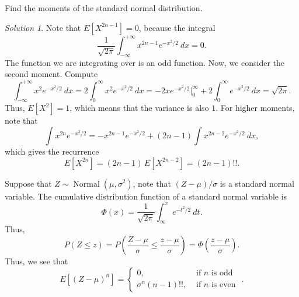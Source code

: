 \documentclass[11pt]{article}
\newcommand\E[1]{E\left[#1\right]}
\theoremstyle{definition}
\theoremstyle{remark}
\newtheorem*{solution}{Solution}
\numberwithin{equation}{module}
\begin{document}
    \begin{exercise}
        Find the moments of the standard normal distribution.
        \begin{solution}
            Note that $\E{X^{2n - 1}} = 0$, because the integral \[
                \frac{1}{\sqrt{2\pi}}\int_{-\infty}^{+\infty} x^{2n - 1}e^{-x^2 /
                2}\:dx = 0.
            \] The function we are integrating over is an odd function. Now, we
            consider the second moment. Compute \[
                \int_{-\infty}^{+\infty} x^2 e^{-x^2 / 2}\:dx = 2 \int_0^\infty x^2
                e^{-x^2 / 2}\:dx = -2xe^{-x^2 / 2}\Big|_0^\infty + 2\int_0^\infty
                e^{-x^2 / 2}\:dx = \sqrt{2\pi}.
            \] Thus, $\E{X^2} = 1$, which means that the variance is also $1$. For
            higher moments, note that \[
                \int x^{2n}e^{-x^2 / 2} = -x^{2n - 1}e^{-x^2 / 2} + (2n - 1)
                \int x^{2n - 2} e^{-x^2 / 2}\:dx,
            \] which gives the recurrence \[
                \E{X^{2n}} = (2n - 1)\, \E{X^{2n - 2}} = (2n - 1)!!.
            \] 
        \end{solution}
    \end{exercise}
    Suppose that $Z \sim \operatorname{Normal}(\mu, \sigma^2)$, note that $(Z - \mu)
    / \sigma$ is a standard normal variable. The cumulative distribution function of
    a standard normal variable is \[
        \Phi(x) = \frac{1}{\sqrt{2\pi}} \int_{\infty}^x e^{-t^2 / 2}\:dt.
    \] Thus, \[
        P(Z \leq z) = P\left(\frac{Z - \mu}{\sigma} \leq \frac{z -
        \mu}{\sigma}\right) = \Phi\left(\frac{z - \mu}{\sigma}\right).
    \] Thus, we see that \[
        \E{(Z - \mu)^n} = \begin{cases}
            0, &\text{ if } n \text{ is odd }\\
            \sigma^n(n - 1)!!, &\text{ if } n \text{ is even }
        \end{cases}.
    \] 
\end{document}

